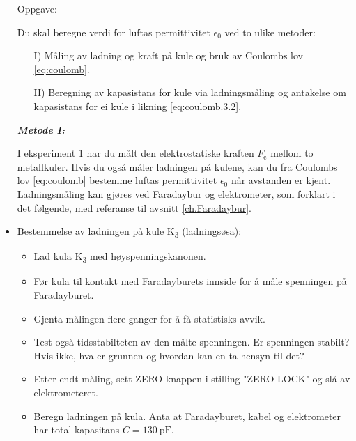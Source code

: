 \documentclass[../Elmag-labhefte-2020.tex]{subfiles}
\begin{document}
\begin{itemize}
Oppgave:\\
{\itsf Du skal beregne verdi for luftas permittivitet $\epsilon_0$ ved to ulike metoder:

\vspace{-4mm}
\begin{itemize}
    \item[I)] Måling av ladning og kraft på kule og bruk av Coulombs lov \eqref{eq:coulomb}.
    \item[II)] Beregning av kapasistans for kule via ladningsmåling og antakelse om kapasistans for ei kule i likning \eqref{eq:coulomb.3.2}.
\end{itemize}
}

\textbf{\emph{Metode I:}}

I eksperiment 1 har du målt den elektrostatiske kraften $F_\text{e}$ mellom to metallkuler. Hvis du også måler ladningen på kulene, kan du fra Coulombs lov \eqref{eq:coulomb} bestemme luftas permittivitet $\epsilon_0$ når avstanden er kjent. Ladningsmåling kan gjøres ved Faradaybur og elektrometer, som forklart i det følgende, med referanse til avsnitt \ref{ch.Faradaybur}.


%
    \item Bestemmelse av ladningen på kule K\textsubscript{3} (ladningsøsa):
    \vspace{-2mm} 
    \begin{itemize}
        \item Lad kula K\textsubscript{3} med høyspenningskanonen. 
        \item Før kula til kontakt med Faradayburets innside for å måle  spenningen på Faradayburet.
        \item Gjenta målingen flere ganger for å få statistisks avvik.
        \item Test også tidsstabilteten av den målte spenningen. Er spenningen stabilt? Hvis ikke, hva er grunnen og hvordan kan en ta hensyn til det? 
        \item Etter endt måling, sett ZERO-knappen i stilling "ZERO LOCK" og slå av elektrometeret.
        \item Beregn ladningen på kula. Anta at Faradayburet, kabel og elektrometer har total kapasitans $C = \SI{130}{\pico\farad}$.
    \end{itemize}
\end{itemize}
\end{document}
